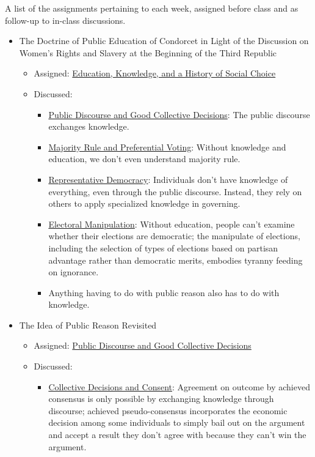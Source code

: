 A list of the assignments pertaining to each week, assigned before class and as follow-up to in-class discussions.

\begin{itemize}
    \item The Doctrine of Public Education of Condorcet in Light of the Discussion on Women's Rights and Slavery at the Beginning of the Third Republic \autocite{Yastrebtseva2015}
    \begin{itemize}
        \item Assigned:  \hyperref[cur:ed-history]{Education, Knowledge, and a History of Social Choice}
        \item Discussed:
        \begin{itemize}
            \item \hyperref[cur:public-discourse]{Public Discourse and Good Collective Decisions}:  The public discourse exchanges knowledge.

            \item \hyperref[cur:majority]{Majority Rule and Preferential Voting}:  Without knowledge and education, we don't even understand majority rule.

            \item \hyperref[cur:representative-democracy]{Representative Democracy}:  Individuals don't have knowledge of everything, even through the public discourse.  Instead, they rely on others to apply specialized knowledge in governing.

            \item \hyperref[cur:manipulation]{Electoral Manipulation}:  Without education, people can't examine whether their elections are democratic; the manipulate of elections, including the selection of types of elections based on partisan advantage rather than democratic merits, embodies tyranny feeding on ignorance.

            \item Anything having to do with public reason also has to do with knowledge.
        \end{itemize}
    \end{itemize}

    \item The Idea of Public Reason Revisited \autocite{Rawls1997}
    \begin{itemize}
        \item Assigned:  \hyperref[cur:public-discourse]{Public Discourse and Good Collective Decisions}
        \item Discussed:
        \begin{itemize}
            \item \hyperref[cur:collective-decisions-consent]{Collective Decisions and Consent}:  Agreement on outcome by achieved consensus is only possible by exchanging knowledge through discourse; achieved pseudo-consensus incorporates the economic decision among some individuals to simply bail out on the argument and accept a result they don't agree with because they can't win the argument.


\end{itemize}
\end{itemize}
\end{itemize}
